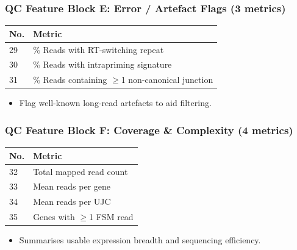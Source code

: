 \documentclass[aspectratio=169]{beamer}
\begin{document}
\begin{frame}
  \frametitle{QC Feature Block E: Error / Artefact Flags (3 metrics)}
  \begin{table}[t]
    \centering
    \small
    \begin{tabular}{@{}ll@{}}
      \toprule
      No. & Metric \\
      \midrule
       29 & \% Reads with RT-switching repeat \\
       30 & \% Reads with intrapriming signature \\
       31 & \% Reads containing $\ge$1 non-canonical junction \\
      \bottomrule
    \end{tabular}
  \end{table}
  \vspace{0.4em}
  \begin{itemize}
    \item Flag well-known long-read artefacts to aid filtering.
  \end{itemize}
\end{frame}

\begin{frame}
  \frametitle{QC Feature Block F: Coverage \& Complexity (4 metrics)}
  \begin{table}[t]
    \centering
    \small
    \begin{tabular}{@{}ll@{}}
      \toprule
      No. & Metric \\
      \midrule
       32 & Total mapped read count \\
       33 & Mean reads per gene \\
       34 & Mean reads per UJC \\
       35 & Genes with $\ge$1 FSM read \\
      \bottomrule
    \end{tabular}
  \end{table}
  \vspace{0.4em}
  \begin{itemize}
    \item Summarises usable expression breadth and sequencing efficiency.
  \end{itemize}
\end{frame}
\end{document}
